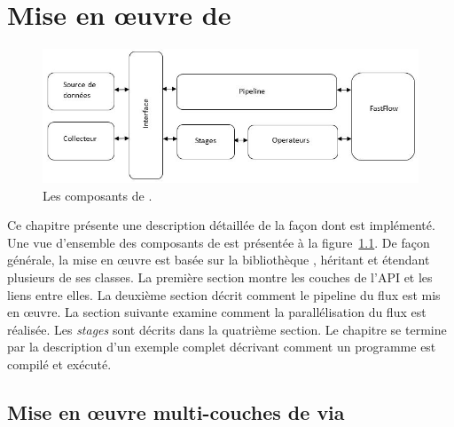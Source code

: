 
\chapter{Mise en \oe{}uvre de \PpFf}
\label{implementation.chap}






\begin{figure}
\centering
     \includegraphics[width=1.0\textwidth]{Figures/AllComponentsAPI.jpg}
      \caption{Les composants de .}
       \label{AllComponentsAPI.fig}
\end{figure}


Ce chapitre pr\'esente une description d\'etaill\'ee de la fa\c{c}on dont  est impl\'ement\'e. Une vue d'ensemble des composants de  est pr\'esent\'ee \`a la figure~\ref{AllComponentsAPI.fig}. De fa\c{c}on g\'en\'erale, la mise en \oe{}uvre est bas\'ee sur la biblioth\`eque , h\'eritant et \'etendant plusieurs de ses classes. La premi\`ere section montre les couches de l'API et les liens entre elles.  La deuxi\`eme section d\'ecrit comment le pipeline du flux est mis en œuvre. La section suivante examine comment la parall\'elisation du flux est r\'ealis\'ee. Les \emph{stages} sont d\'ecrits dans la quatri\`eme section. Le chapitre se termine par la description d'un exemple complet d\'ecrivant comment un programme \PpFf{} est compil\'e et ex\'ecut\'e.


\section{Mise en \oe{}uvre multi-couches de \PpFf{} via }

